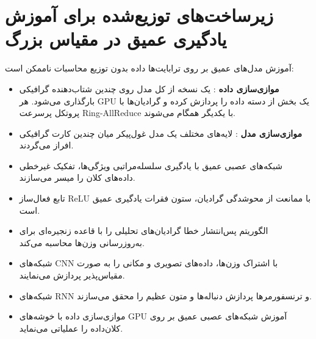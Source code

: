 \section{زیرساخت‌های توزیع‌شده برای آموزش یادگیری عمیق در مقیاس بزرگ}
آموزش مدل‌های عمیق بر روی ترابایت‌ها داده بدون توزیع محاسبات ناممکن است:
\begin{itemize}
    \item \textbf{موازی‌سازی داده }: یک نسخه از کل مدل روی چندین شتاب‌دهنده گرافیکی  بارگذاری می‌شود. هر GPU یک بخش از دسته داده  را پردازش کرده و گرادیان‌ها با پروتکل پرسرعت Ring-AllReduce با یکدیگر همگام می‌شوند.
    \item \textbf{موازی‌سازی مدل }: لایه‌های مختلف یک مدل غول‌پیکر میان چندین کارت گرافیکی افراز می‌گردند.
\end{itemize}

\begin{summarybox}
\begin{itemize}
    \item شبکه‌های عصبی عمیق با یادگیری سلسله‌مراتبی ویژگی‌ها، تفکیک غیرخطی داده‌های کلان را میسر می‌سازند.
    \item تابع فعال‌ساز ReLU با ممانعت از محوشدگی گرادیان، ستون فقرات یادگیری عمیق است.
    \item الگوریتم پس‌انتشار خطا گرادیان‌های تحلیلی را با قاعده زنجیره‌ای برای به‌روزرسانی وزن‌ها محاسبه می‌کند.
    \item شبکه‌های CNN با اشتراک وزن‌ها، داده‌های تصویری و مکانی را به صورت مقیاس‌پذیر پردازش می‌نمایند.
    \item شبکه‌های RNN و ترنسفورمرها پردازش دنباله‌ها و متون عظیم را محقق می‌سازند.
    \item موازی‌سازی داده با خوشه‌های GPU آموزش شبکه‌های عصبی عمیق بر روی کلان‌داده را عملیاتی می‌نماید.
\end{itemize}
\end{summarybox}
